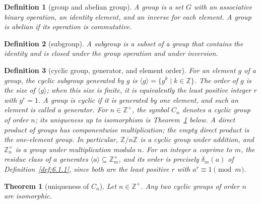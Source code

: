\documentclass[11pt]{article}
\theoremstyle{ntstyle}
\newtheorem{theorem}{Theorem}[subsection]
\newtheorem{definition}{Definition}[subsection]
\newcommand{\ZmodUnits}[1]{\mathbb{Z}_{#1}^{\times}}
\begin{document}
\begin{definition}[group and abelian group]\label{def:6.6.1}
	A group is a set $G$ with an associative binary operation, an identity
	element, and an inverse for each element. A group is abelian if its
	operation is commutative.

\end{definition}
\begin{definition}[subgroup]\label{def:6.6.2}
	A subgroup is a subset of a group that contains the identity and is
	closed under the group operation and under inversion.

\end{definition}
\begin{definition}[cyclic group, generator, and element order]\label{def:6.6.3}
	For an element $g$ of a group, the cyclic subgroup generated by $g$ is
	$\langle g\rangle=\{g^k\mid k\in\mathbb{Z}\}$. The order of $g$ is the
	size of $\langle g\rangle$; when this size is finite, it is equivalently
	the least positive integer $r$ with $g^r=1$. A group is cyclic if it is
	generated by one element, and such an element is called a generator.
	For $n\in\mathbb{Z}^+$, the symbol $C_n$ denotes a cyclic group of order $n$;
	its uniqueness up to isomorphism is Theorem~\ref{thm:6.6.1} below.
	A direct product of groups has componentwise multiplication; the empty
	direct product is the one-element group.
	In particular, $\mathbb{Z}/n\mathbb{Z}$ is a cyclic group under addition,
	and $\ZmodUnits{n}$ is a group under multiplication modulo $n$. For an
	integer $a$ coprime to $m$, the residue class of $a$ generates
	$\langle a\rangle\subseteq\ZmodUnits{m}$, and its order is precisely
	$\delta_m(a)$ of Definition~\ref{def:6.1.1}, since both are the least
	positive $r$ with $a^r\equiv1\pmod m$.

\end{definition}
\begin{theorem}[uniqueness of $C_n$]\label{thm:6.6.1}
	Let $n\in\mathbb{Z}^+$. Any two cyclic groups of order $n$ are isomorphic.

\end{theorem}
\end{document}
